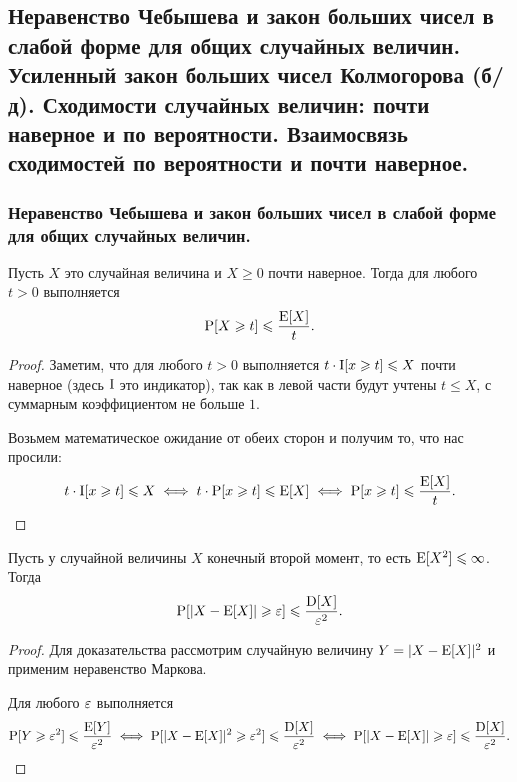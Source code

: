 \subsection{Неравенство Чебышева и закон больших чисел в слабой форме для общих случайных величин. Усиленный закон больших чисел Колмогорова (б/д). Сходимости случайных величин: почти наверное и по вероятности. Взаимосвязь сходимостей по вероятности и почти наверное.}

\subsubsection{Неравенство Чебышева и закон больших чисел в слабой форме для общих случайных величин.}

\begin{theorem*}
    Пусть $X$ это случайная величина и $X \geq 0$ почти наверное. Тогда для любого $t > 0$ выполняется
    \begin{equation*}
        \operatorname{P}[X \geqslant t] \leqslant \dfrac{\operatorname{E}[X]}{t}.
    \end{equation*}
\end{theorem*}

\begin{proof}
    Заметим, что для любого $t > 0$ выполняется $t \cdot \operatorname{I}[x \geqslant t] \leqslant X$ почти наверное (здесь $\operatorname{I}$ это индикатор), так как в левой части будут учтены $t \leq X$, с суммарным коэффициентом не больше $1$.

    Возьмем математическое ожидание от обеих сторон и получим то, что нас просили:
    \begin{equation*}
        t \cdot \operatorname{I}[x \geqslant t] \leqslant X
        \iff t \cdot \operatorname{P}[x \geqslant t] \leqslant \operatorname{E}[X] 
        \iff \operatorname{P}[x \geqslant t] \leqslant \dfrac{\operatorname{E}[X]}{t}.
    \end{equation*}
\end{proof}

\begin{theorem*}
    Пусть у случайной величины $X$ конечный второй момент, то есть $\operatorname{E}[X^2] \leqslant \infty$. Тогда
    \begin{equation*}
        \operatorname{P}[|X - \operatorname{E}[X]| \geqslant \varepsilon] \leqslant \dfrac{\operatorname{D}[X]}{\varepsilon^2}.
    \end{equation*}
\end{theorem*}

\begin{proof}
    Для доказательства рассмотрим случайную величину $Y = |X - \operatorname{E}[X]|^2$ и применим неравенство Маркова.

    Для любого $\varepsilon$ выполняется
    \begin{equation*}
        \operatorname{P}[Y \geqslant \varepsilon^2] \leqslant \dfrac{\operatorname{E}[Y]}{\varepsilon^2}
        \iff \operatorname{P}[|X - \operatorname{E}[X]|^2 \geqslant \varepsilon^2] \leqslant \dfrac{\operatorname{D}[X]}{\varepsilon^2}
        \iff \operatorname{P}[|X - \operatorname{E}[X]| \geqslant \varepsilon] \leqslant \dfrac{\operatorname{D}[X]}{\varepsilon^2}.
    \end{equation*}
\end{proof}

